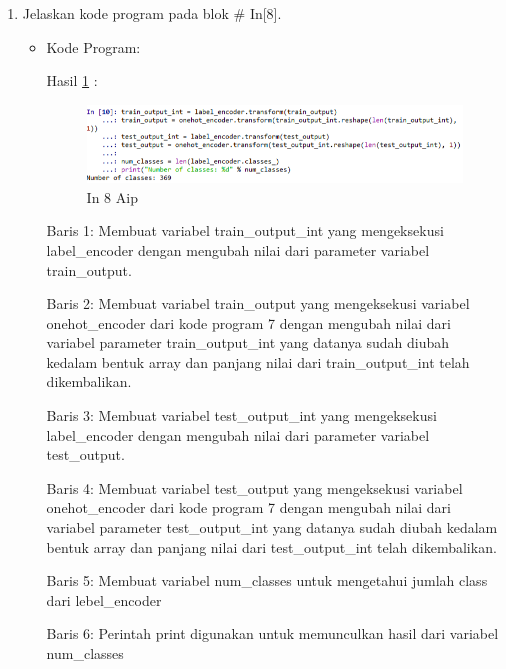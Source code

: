 \begin{enumerate}
\item Jelaskan kode program pada blok \# In[8].
\begin{itemize}
\item Kode Program:

\par Hasil \ref{in8aip} :
\begin{figure}[!hbtp]
\centering
\includegraphics[scale=0.7]{figures/AIP/prak8.PNG}
\caption{In 8 Aip}
\label{in8aip}
\end{figure}
\par Baris 1: Membuat variabel train\_output\_int yang mengeksekusi label\_encoder dengan mengubah nilai dari parameter variabel train\_output.
\par Baris 2: Membuat variabel train\_output yang mengeksekusi variabel onehot\_encoder dari kode program 7 dengan mengubah nilai dari variabel parameter train\_output\_int yang datanya sudah diubah kedalam bentuk array dan panjang nilai dari train\_output\_int telah dikembalikan.
\par Baris 3: Membuat variabel test\_output\_int yang mengeksekusi label\_encoder dengan mengubah nilai dari parameter variabel test\_output.
\par Baris 4: Membuat variabel test\_output yang mengeksekusi variabel onehot\_encoder dari kode program 7 dengan mengubah nilai dari variabel parameter test\_output\_int yang datanya sudah diubah kedalam bentuk array dan panjang nilai dari test\_output\_int telah dikembalikan.
\par Baris 5: Membuat variabel num\_classes untuk mengetahui jumlah class dari lebel\_encoder
\par Baris 6: Perintah print digunakan untuk memunculkan hasil dari variabel num\_classes
\end{itemize}
\par


\end{enumerate}
